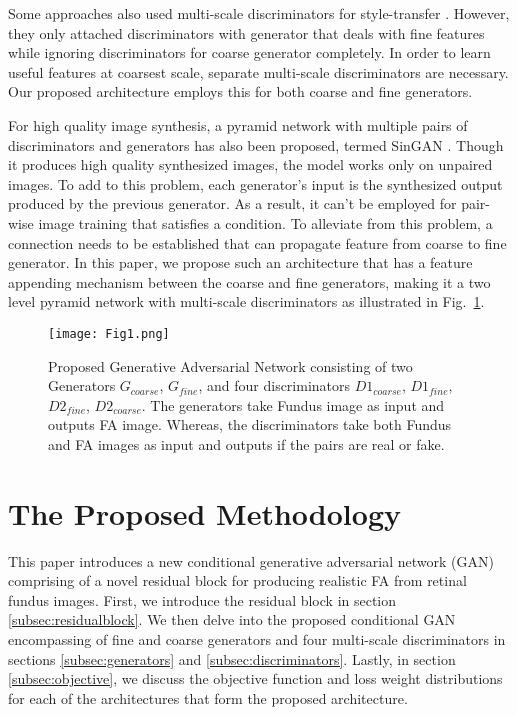 \documentclass[runningheads]{llncs}
\begin{document}
Some approaches also used multi-scale discriminators for style-transfer \cite{wang2018high}. However, they only attached discriminators with generator that deals with fine features while ignoring discriminators for coarse generator completely. In order to learn useful features at coarsest scale, separate multi-scale discriminators are necessary. Our proposed architecture employs this for both coarse and fine generators. 

For high quality image synthesis, a pyramid network with multiple pairs of discriminators and generators has also been proposed, termed SinGAN \cite{shaham2019singan}. Though it produces high quality synthesized images, the model works only on unpaired images. To add to this problem, each generator's input is the synthesized output produced by the previous generator. As a result, it can't be employed for pair-wise image training that satisfies a condition. To alleviate from this problem, a connection needs to be established that can propagate feature from coarse to fine generator. In this paper, we propose such an architecture that has a feature appending mechanism between the coarse and fine generators, making it a two level pyramid network with multi-scale discriminators as illustrated in Fig.~\ref{fig1}. 

\begin{figure}[htb]
    \centering
    \texttt{[image: Fig1.png]}
    \caption{Proposed Generative Adversarial Network consisting of two Generators $G_{coarse}$, $G_{fine}$, and four discriminators $D1_{coarse}$, $D1_{fine}$, $D2_{fine}$, $D2_{coarse}$. The generators take Fundus image as input and outputs FA image. Whereas, the discriminators take both Fundus and FA images as input and outputs if the pairs are real or fake. }
    \label{fig1}
\end{figure}

\section{The Proposed Methodology}
This paper introduces a new conditional generative adversarial network (GAN) comprising of a novel residual block for producing realistic FA from retinal fundus images. First, we introduce the residual block in section \ref{subsec:residualblock}. We then delve into the proposed conditional GAN encompassing of fine and coarse generators and four multi-scale discriminators in sections \ref{subsec:generators} and \ref{subsec:discriminators}. Lastly, in section \ref{subsec:objective}, we discuss the objective function and loss weight distributions for each of the architectures that form the proposed architecture.
\end{document}
